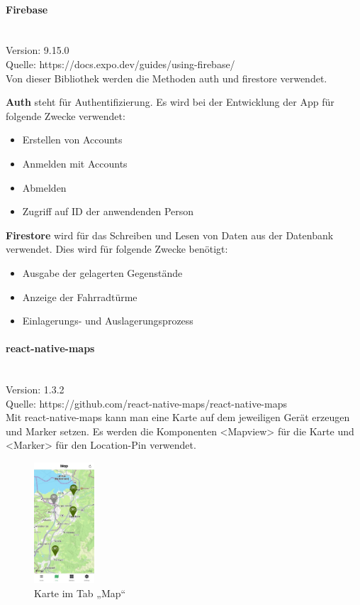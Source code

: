 \bigskip

\paragraph{Firebase}\mbox{}\\
Version: 9.15.0\\
Quelle: https://docs.expo.dev/guides/using-firebase/\\
Von dieser Bibliothek werden die Methoden auth und firestore verwendet.

\noindent\textbf{Auth} steht für Authentifizierung. Es wird bei der Entwicklung der App für folgende Zwecke verwendet:

\begin{itemize}
  \item Erstellen von Accounts
  \item Anmelden mit Accounts
  \item Abmelden
  \item Zugriff auf ID der anwendenden Person
\end{itemize}

\noindent\textbf{Firestore} wird für das Schreiben und Lesen von Daten aus der Datenbank verwendet. Dies wird für folgende Zwecke benötigt:

\begin{itemize}
  \item Ausgabe der gelagerten Gegenstände
  \item Anzeige der Fahrradtürme
  \item Einlagerungs- und Auslagerungsprozess
\end{itemize}

\bigskip

\paragraph{react-native-maps}\mbox{}\\
Version: 1.3.2\\
Quelle: https://github.com/react-native-maps/react-native-maps\\
Mit react-native-maps kann man eine Karte auf dem jeweiligen Gerät erzeugen und Marker setzen. Es werden die Komponenten <Mapview> für die Karte und <Marker> für den \Gls{Location-Pin} verwendet.

\begin{figure}[H]
  \centering
  \includegraphics[width=0.2\textwidth]{images/app-screenshots/tabmap.jpg}
  \caption{Karte im Tab „Map“}
  \label{fig:tabmap}
\end{figure}

